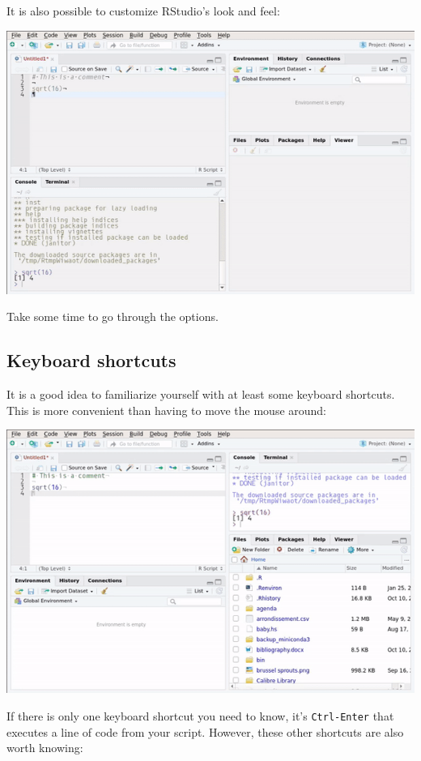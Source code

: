 \documentclass[]{gitbook}
\begin{document}
It is also possible to customize RStudio's look and feel:

\includegraphics{pics/rstudio_options.gif}

Take some time to go through the options.

\hypertarget{keyboard-shortcuts}{%
\subsection{Keyboard shortcuts}\label{keyboard-shortcuts}}

It is a good idea to familiarize yourself with at least some keyboard shortcuts. This is more
convenient than having to move the mouse around:

\includegraphics{pics/rstudio_shortcuts.gif}

If there is only one keyboard shortcut you need to know, it's \texttt{Ctrl-Enter} that executes a line of code
from your script. However, these other shortcuts are also worth knowing:
\end{document}
